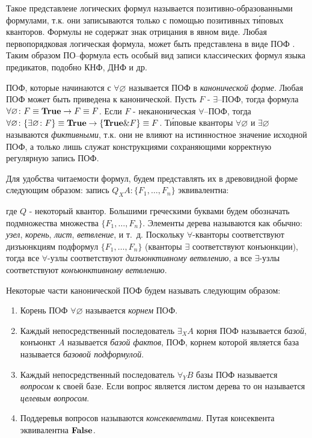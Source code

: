 \documentclass[a4paper]{jctart15b}
\begin{document}
Такое представлеие логических формул называется позитивно-образованными формулами, т.к. они записываются только с помощью позитивных т\'иповых кванторов. Формулы не содержат знак отрицания в явном виде. Любая первопорядковая логическая формула, может быть представлена в виде ПОФ \cite{ICDS2000}. Таким образом ПО--формула есть особый вид записи классических формул языка предикатов, подобно КНФ, ДНФ и др.

ПОФ, которые начинаются с $\forall \varnothing$ называется ПОФ в {\em
  канонической форме}. Любая ПОФ может быть приведена к канонической. Пусть $F$
- $\exists$--ПОФ, тогда формула $\forall \varnothing\colon F \equiv
\text{\textbf{True}} \rightarrow F \equiv F$. Если $F$ - неканоническая
$\forall$--ПОФ, тогда $\forall \varnothing\colon\{\exists \varnothing\colon F\}
\equiv \text{\textbf{True}} \rightarrow \{\text{\textbf{True}}\&F\} \equiv F$.
Т\'иповые кванторы $\forall \varnothing$ и $\exists \varnothing$ называются {\em
  фиктивными}, т.к. они не влияют на истинностное значение исходной ПОФ, а
только лишь служат конструкциями сохраняющими корректную регулярную запись ПОФ.

Для удобства читаемости формул, будем представлять их в древовидной форме следующим образом: запись $Q_XA\colon\{F_1,\ldots,F_n\}$ эквивалентна:
\begin{center}
\end{center}
\noindent где $Q$ - некоторый квантор. Большими греческими буквами будем обозначать подмножества множества $\{F_1,\ldots,F_n\}$. Элементы дерева называются как обычно: \emph{узел}, \emph{корень}, \emph{лист}, \emph{ветвление}, и т.~д. Поскольку $\forall$-кванторы соответствуют дизъюнкциям подформул $\{F_1,\ldots,F_n\}$ (кванторы $\exists$ соответствуют конъюнкции), тогда все $\forall$-узлы соответствуют {\em дизъюнктивному ветвлению}, а все $\exists$-узлы соответствуют {\em конъюнктивному ветвлению}.

Некоторые части канонической ПОФ будем называть следующим образом:
\begin{enumerate}
\item Корень ПОФ $\forall \varnothing$ называется {\em корнем} ПОФ.
\item Каждый непосредственный последователь $\exists_XA$ корня ПОФ называется {\em базой}, конъюнкт $A$ называется {\em базой фактов}, ПОФ, корнем которой является база называется {\em базовой подформулой}.
\item Каждый непосредственный последователь $\forall_YB$ базы ПОФ называется {\em вопросом} к своей базе. Если вопрос является листом дерева то он называется {\em целевым вопросом}.
\item Поддеревья вопросов называются {\em консеквентами}. Путая консеквента эквивалентна $\text{\textbf{False}}$.
\end{enumerate}
\end{document}
